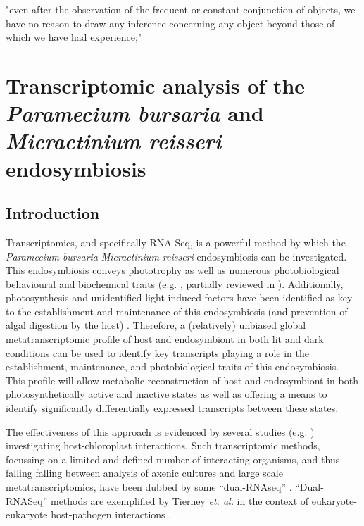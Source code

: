 \graphicspath{{chapters/4.Chapter_2/figures}}

\begin{savequote}[75mm]
"even after the observation of the frequent or constant conjunction of objects, we have no reason to draw any inference concerning any object beyond those of which we have had experience;"
\end{savequote}


\chapter{Transcriptomic analysis of the \textit{Paramecium bursaria} and \textit{Micractinium reisseri} endosymbiosis}

\section{Introduction}

Transcriptomics, and specifically RNA-Seq, is a powerful method by which the \textit{Paramecium bursaria}-\textit{Micractinium reisseri}
endosymbiosis can be investigated. This endosymbiosis conveys phototrophy \citep{Karakashian1963} as well as 
numerous photobiological behavioural and biochemical traits (e.g. \citep{Berk1991,Saji1974,Nakajima1989,Niess1982a,Iwatsuki1988,Summerer2009}, 
partially reviewed in \citep{Sommaruga2009}).  Additionally, photosynthesis and unidentified light-induced factors have been identified as key to the establishment
and maintenance of this endosymbiosis (and prevention of algal digestion by the host) \citep{Karakashian1963,Hosoya1995a,Kodama2007,Kodama2014c}.
Therefore, a (relatively) unbiased global metatranscriptomic profile of host and endosymbiont in both lit and dark conditions can be used to 
identify key transcripts playing a role in the establishment, maintenance, and photobiological traits of this endosymbiosis. 
This profile will allow metabolic reconstruction of host and endosymbiont in both photosynthetically active and inactive
states as well as offering a means to identify significantly differentially expressed transcripts between these states.


The effectiveness of this approach is evidenced by several studies (e.g. \citep{Nowack2011,Jiggins2013,Xiang2015}) investigating
host-chloroplast interactions. Such transcriptomic methods, focussing on a limited and defined number of interacting organisms, and thus falling 
falling between analysis of axenic cultures and
large scale metatranscriptomics, have been dubbed by some ``dual-RNAseq'' \citep{Westermann2012}.  
``Dual-RNASeq'' methods are exemplified by Tierney \textit{et. al.} in the context of eukaryote-eukaryote host-pathogen interactions \citep{Tieryney2012}.


